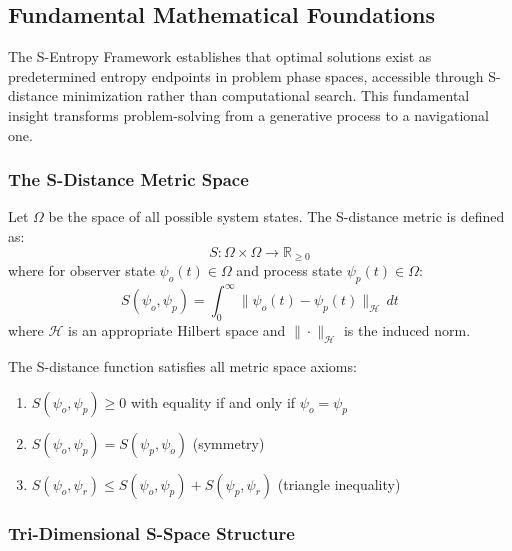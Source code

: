 \documentclass[11pt,a4paper]{article}
\begin{document}
\subsection{Fundamental Mathematical Foundations}

The S-Entropy Framework establishes that optimal solutions exist as predetermined entropy endpoints in problem phase spaces, accessible through S-distance minimization rather than computational search. This fundamental insight transforms problem-solving from a generative process to a navigational one.

\subsubsection{The S-Distance Metric Space}

\begin{definition}
Let $\Omega$ be the space of all possible system states. The S-distance metric is defined as:
\begin{equation}
S: \Omega \times \Omega \to \mathbb{R}_{\geq 0}
\end{equation}
where for observer state $\psi_o(t) \in \Omega$ and process state $\psi_p(t) \in \Omega$:
\begin{equation}
S(\psi_o, \psi_p) = \int_0^{\infty} \|\psi_o(t) - \psi_p(t)\|_{\mathcal{H}} \, dt
\label{eq:s_distance}
\end{equation}
where $\mathcal{H}$ is an appropriate Hilbert space and $\|\cdot\|_{\mathcal{H}}$ is the induced norm.
\end{definition}

\begin{theorem}
The S-distance function satisfies all metric space axioms:
\begin{enumerate}
\item $S(\psi_o, \psi_p) \geq 0$ with equality if and only if $\psi_o = \psi_p$
\item $S(\psi_o, \psi_p) = S(\psi_p, \psi_o)$ (symmetry)
\item $S(\psi_o, \psi_r) \leq S(\psi_o, \psi_p) + S(\psi_p, \psi_r)$ (triangle inequality)
\end{enumerate}
\end{theorem}

\subsubsection{Tri-Dimensional S-Space Structure}
\end{document}
